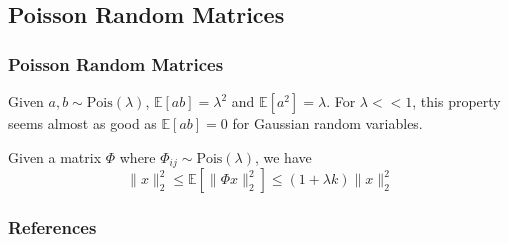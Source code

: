 \documentclass[aspectratio=34]{beamer}
\begin{document}
\subsection{Poisson Random Matrices}
\begin{frame}
    \frametitle{Poisson Random Matrices}
    Given $a,b \sim \text{Pois}(\lambda)$, $\mathbb{E}[ab] = \lambda^2$ and $\mathbb{E}[a^2] = \lambda$.
    For $\lambda << 1$, this property seems almost as good as $\mathbb{E}[ab] = 0$ for Gaussian random variables. 
    
    \begin{Lemma}
    	
    Given a matrix $\Phi$ where $\Phi_{ij} \sim \text{Pois}(\lambda)$, we have
    \[\|x\|_2^2 \le \mathbb{E}[\|\Phi x\|_2^2] \le (1+\lambda k)\|x\|_2^2\]	
    \end{Lemma}

\end{frame}

\begin{frame}[t,allowframebreaks]{}
\frametitle{References}



\end{frame}
\end{document}
